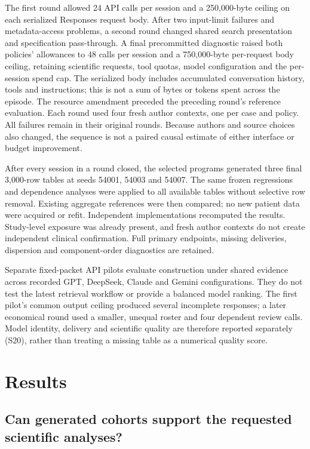 \documentclass[11pt,letterpaper]{article}
\begin{document}
The first round allowed 24 API calls per session and a 250,000-byte ceiling on each serialized Responses request body. After two input-limit failures and metadata-access problems, a second round changed shared search presentation and specification pass-through. A final precommitted diagnostic raised both policies' allowances to 48 calls per session and a 750,000-byte per-request body ceiling, retaining scientific requests, tool quotas, model configuration and the per-session spend cap. The serialized body includes accumulated conversation history, tools and instructions; this is not a sum of bytes or tokens spent across the episode. The resource amendment preceded the preceding round's reference evaluation. Each round used four fresh author contexts, one per case and policy. All failures remain in their original rounds. Because authors and source choices also changed, the sequence is not a paired causal estimate of either interface or budget improvement.


After every session in a round closed, the selected programs generated three final 3,000-row tables at seeds 54001, 54003 and 54007. The same frozen regressions and dependence analyses were applied to all available tables without selective row removal. Existing aggregate references were then compared; no new patient data were acquired or refit. Independent implementations recomputed the results. Study-level exposure was already present, and fresh author contexts do not create independent clinical confirmation. Full primary endpoints, missing deliveries, dispersion and component-order diagnostics are retained.


Separate fixed-packet API pilots evaluate construction under shared evidence across recorded GPT, DeepSeek, Claude and Gemini configurations. They do not test the latest retrieval workflow or provide a balanced model ranking. The first pilot's common output ceiling produced several incomplete responses; a later economical round used a smaller, unequal roster and four dependent review calls. Model identity, delivery and scientific quality are therefore reported separately (S20), rather than treating a missing table as a numerical quality score.


\section{Results}

\subsection{Can generated cohorts support the requested scientific analyses?}
\end{document}
